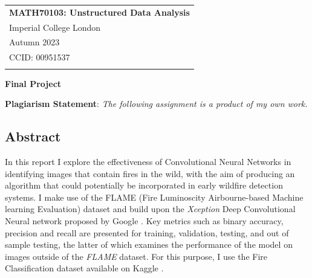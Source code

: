 \documentclass[a4paper,11pt]{article} %
\begin{document}



\thispagestyle{empty} %

\begin{tabular}{p{15.5cm}} %
{\large \bf MATH70103: Unstructured Data Analysis} \\
Imperial College London \\ Autumn 2023  \\ CCID: 00951537\\
\hline %
\\
\end{tabular} %

\vspace*{0.3cm} %

\begin{center} %
	{\Large \bf Final Project} %
\end{center}  

\vspace{0.4cm}


\textbf{Plagiarism Statement}: \emph{The following assignment is a product of my own work.}

\medskip

\subsection*{Abstract}

In this report I explore the effectiveness of Convolutional Neural Networks in identifying images
that contain fires in the wild, with the aim of producing an algorithm that could potentially be incorporated 
in early wildfire detection systems. I make use of the FLAME (Fire Luminoscity Airbourne-based Machine learning Evaluation)
dataset \cite{FLAME_dataset} and build upon the \emph{Xception} Deep Convolutional Neural network proposed by Google \cite{Xception}.
Key metrics such as binary accuracy, precision and recall are presented for training, validation, testing, and out of sample testing, the latter
of which examines the performance of the model on images outside of the \emph{FLAME} dataset. For this purpose, I use the Fire Classification dataset
available on Kaggle \cite{Kaggle_FIRE_Dataset}.
\end{document}
